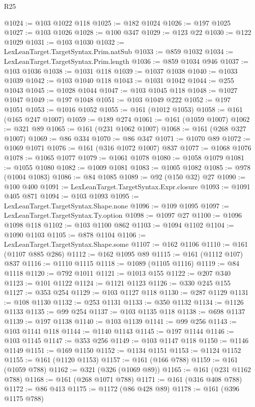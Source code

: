 \begin{lexlean}{R25}
\begin{coremodule}
@1024 := @103 @1022 @118
@1025 := @182 @1024
@1026 := @197 @1025
@1027 := @103 @1026
@1028 := @100 @347
@1029 := @123 @22
@1030 := @122 @1029
@1031 := @103 @1030
@1032 := LexLeanTarget.TargetSyntax.Prim.natSub
@1033 := @859 @1032
@1034 := LexLeanTarget.TargetSyntax.Prim.length
@1036 := @859 @1034 @946
@1037 := @103 @1036
@1038 := @1031 @118
@1039 := @1037 @1038
@1040 := @1033 @1039
@1042 := @103 @1040 @118
@1043 := @1031 @1042
@1044 := @255 @1043
@1045 := @1028 @1044
@1047 := @103 @1045 @118
@1048 := @1027 @1047
@1049 := @197 @1048
@1051 := @103 @1049 @222
@1052 := @197 @1051
@1053 := @1016 @1052
@1055 := @161 (@1012 @1053)
@1058 := @161 (@165 @247 @1007)
@1059 := @189 @274
@1061 := @161 (@1059 @1007)
@1062 := @321 @89
@1065 := @161 (@231 @1062 @1007)
@1068 := @161 (@268 @327 @1007)
@1069 := @86 @334
@1070 := @86 @347
@1071 := @1070 @89
@1072 := @1069 @1071
@1076 := @161 (@316 @1072 @1007) @837
@1077 := @1068 @1076
@1078 := @1065 @1077
@1079 := @1061 @1078
@1080 := @1058 @1079
@1081 := @1055 @1080
@1082 := @1009 @1081
@1083 := @1005 @1082
@1085 := @978 (@1004 @1083)
@1086 := @84 @1085
@1089 := @92 (@150 @32) @27
@1090 := @100 @400
@1091 := LexLeanTarget.TargetSyntax.Expr.closure
@1093 := @1091 @405 @871
@1094 := @103 @1093
@1095 := LexLeanTarget.TargetSyntax.Shape.none
@1096 := @109 @1095
@1097 := LexLeanTarget.TargetSyntax.Ty.option
@1098 := @1097 @27
@1100 := @1096 @1098 @118
@1102 := @103 @1100 @862
@1103 := @1094 @1102
@1104 := @1090 @1103
@1105 := @878 @1104
@1106 := LexLeanTarget.TargetSyntax.Shape.some
@1107 := @162 @1106
@1110 := @161 (@1107 @885 @286)
@1112 := @162 @1095 @89
@1115 := @161 (@1112 @107) @837
@1116 := @1110 @1115
@1118 := @1089 (@1105 @1116)
@1119 := @84 @1118
@1120 := @792 @1011
@1121 := @1013 @155
@1122 := @207 @340
@1123 := @101 @1122
@1124 := @1121 @1123
@1126 := @330 @245 @155
@1127 := @353 @254
@1129 := @103 @1127 @118
@1130 := @287 @1129
@1131 := @108 @1130
@1132 := @253 @1131
@1133 := @350 @1132
@1134 := @1126 @1133
@1135 := @99 @254
@1137 := @103 @1135 @118
@1138 := @698 @1137
@1139 := @197 @1138
@1140 := @103 @1139
@1141 := @99 @256
@1143 := @103 @1141 @118
@1144 := @1140 @1143
@1145 := @197 @1144
@1146 := @103 @1145
@1147 := @353 @256
@1149 := @103 @1147 @118
@1150 := @1146 @1149
@1151 := @169 @1150
@1152 := @1134 @1151
@1153 := @1124 @1152
@1155 := @161 (@1120 @1153)
@1157 := @161 (@166 @788)
@1159 := @161 (@1059 @788)
@1162 := @321 (@326 (@1069 @89))
@1165 := @161 (@231 @1162 @788)
@1168 := @161 (@268 @1071 @788)
@1171 := @161 (@316 @408 @788)
@1172 := @86 @413
@1175 := @1172 (@86 @428 @89)
@1178 := @161 (@396 @1175 @788)

\end{coremodule}
\end{lexlean}
